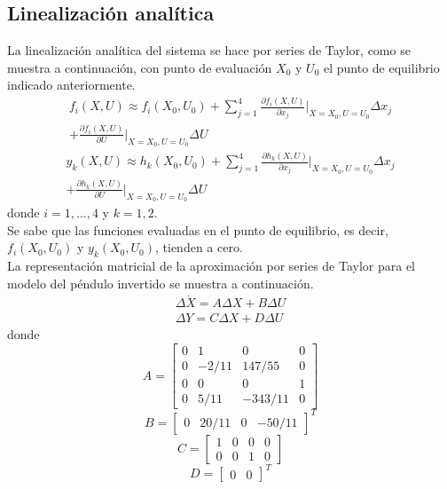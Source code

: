 \documentclass[journal]{IEEEtran}
\begin{document}
\subsection{Linealización analítica}
La linealización analítica del sistema se hace por series de Taylor, como se muestra a continuación, con punto de evaluación $X_0$ y $U_0$ el punto de equilibrio indicado anteriormente.
\[\begin{split}
f_i(X, U) \approx f_i(X_0, U_0) + \sum_{j=1}^{4}\frac{\partial f_i(X, U)}{\partial x_j}\bigg\rvert_{X=X_0, U=U_0}\Delta x_j \\
+\frac{\partial f_i(X, U)}{\partial U}\bigg\rvert_{X=X_0, U=U_0}\Delta U
\end{split}\]
\[\begin{split}
y_k(X, U) \approx h_k(X_0, U_0) + \sum_{j=1}^{4}\frac{\partial h_k(X, U)}{\partial x_j}\bigg\rvert_{X=X_0, U=U_0}\Delta x_j\\
+ \frac{\partial h_k(X, U)}{\partial U}\bigg\rvert_{X=X_0, U=U_0}\Delta U
\end{split}\]
donde $i=1,...,4$ y $k=1,2$.\\

Se sabe que las funciones evaluadas en el punto de equilibrio, es decir, $f_i(X_0, U_0)$ y $y_k(X_0, U_0)$, tienden a cero.\\

La representación matricial de la aproximación por series de Taylor para el modelo del péndulo invertido se muestra a continuación.
\begin{eqnarray}
\Delta\dot{X} = A\Delta X + B\Delta U\\
\Delta Y = C\Delta X + D\Delta U
\end{eqnarray}
donde
\[A =\begin{bmatrix}
    0 & 1 & 0 & 0\\
    0 & -2/11 & 147/55 & 0\\
    0 & 0 & 0 & 1\\
    0 & 5/11 & -343/11 & 0
\end{bmatrix}
\]
\[B = \begin{bmatrix}
    0 &
    20/11 &
    0 &
    -50/11
\end{bmatrix}^{T}\]
\[C = \begin{bmatrix}
    1 & 0 & 0 & 0\\
    0 & 0 & 1 & 0
\end{bmatrix}\]
\[D = \begin{bmatrix}
    0&
    0
\end{bmatrix}^{T}\]
\end{document}
